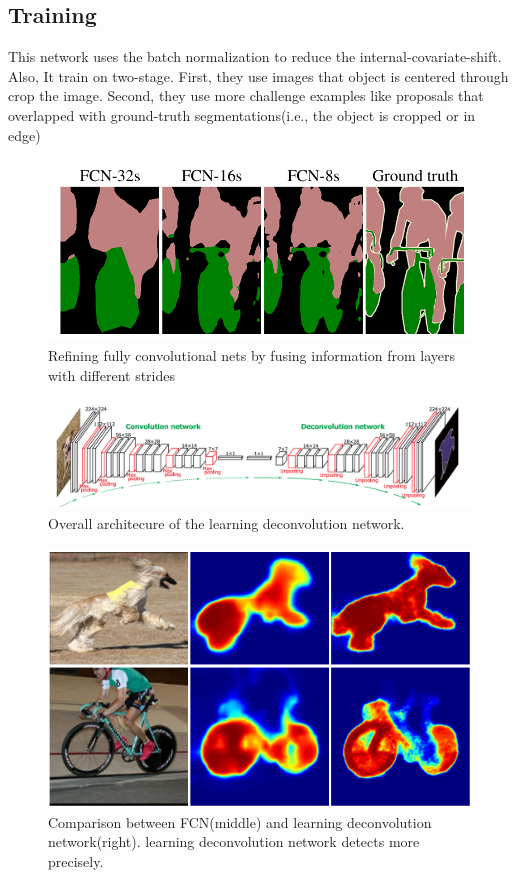 \documentclass[extendedabs]{bmvc2k}
\begin{document}
\subsection{Training}
This network uses the batch normalization to reduce the internal-covariate-shift. Also, It train on two-stage. First, they use images that object is centered through crop the image. Second, they use more challenge examples like proposals that overlapped with ground-truth segmentations(i.e., the object is cropped or in edge)
\begin{figure}[t]
	\includegraphics[width=\linewidth]{images/fig3.png}
	\caption{
		Refining fully convolutional nets by fusing information from layers with different strides}
	\vspace{-2mm}
 \label{skip}
\end{figure}
\begin{figure}[t]
	\includegraphics[width=\linewidth]{images/fig4.png}
	\caption{
		Overall architecure of the learning deconvolution network.}
	\vspace{-2mm}
 \label{learndeconv}
\end{figure}
\begin{figure}[t]
	\includegraphics[width=\linewidth]{images/fig5.png}
	\caption{
		Comparison between FCN(middle) and learning deconvolution network(right). learning deconvolution network detects more precisely.}
	\vspace{-2mm}
 \label{compare_FCN_Deconv}

\end{figure}
\end{document}
